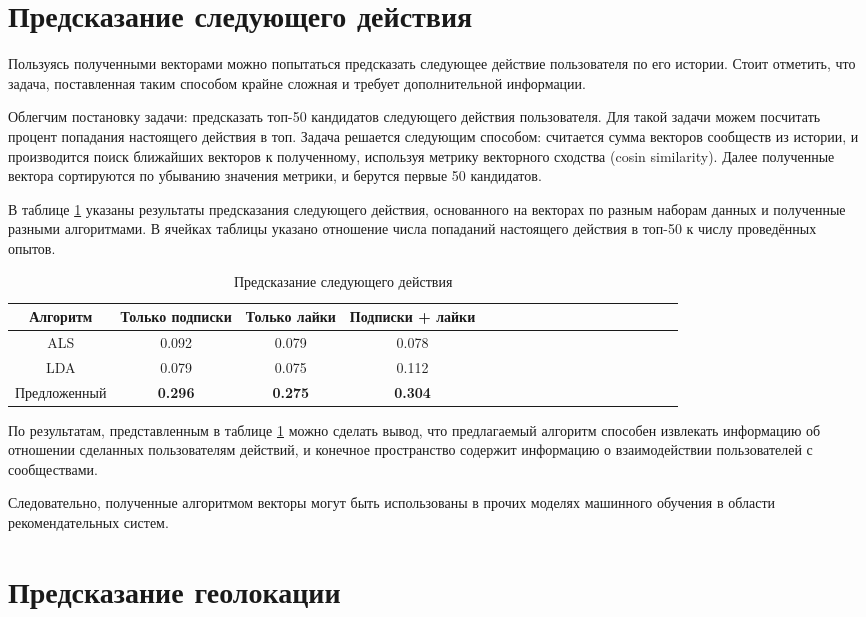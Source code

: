 \documentclass[times,specification,annotation]{itmo-student-thesis}
\begin{document}
\section{Предсказание следующего действия}\label{sec:next-action}
Пользуясь полученными векторами можно попытаться предсказать следующее действие пользователя по его истории. Стоит отметить, что задача, поставленная таким способом крайне сложная и требует дополнительной информации.

Облегчим постановку задачи: предсказать топ-50 кандидатов следующего действия пользователя. Для такой задачи можем посчитать процент попадания настоящего действия в топ. Задача решается следующим способом: считается сумма векторов сообществ из истории, и производится поиск ближайших векторов к полученному, используя метрику векторного сходства (cosin similarity). Далее полученные вектора сортируются по убыванию значения метрики, и берутся первые 50 кандидатов.

В таблице \ref {tab2-next-action} указаны результаты предсказания следующего действия, основанного на векторах по разным наборам данных и полученные разными алгоритмами. В ячейках таблицы указано отношение числа попаданий настоящего действия в топ-50 к числу проведённых опытов.  

\begin{table}[!h]
\caption{Предсказание следующего действия} \label{tab2-next-action}
\centering
\begin{tabular}{|*{18}{c|}}\hline
Алгоритм  & Только подписки  & Только лайки & Подписки + лайки \\\hline
ALS                        & 0.092 & 0.079  & 0.078 \\\hline
LDA                       & 0.079 & 0.075  & 0.112 \\\hline
Предложенный & \textbf{0.296} & \textbf{0.275} & \textbf{0.304} \\\hline
\end{tabular}
\end{table}

По результатам, представленным в таблице \ref{tab2-next-action} можно сделать вывод, что предлагаемый алгоритм способен извлекать информацию об отношении сделанных пользователям действий, и конечное пространство содержит информацию о взаимодействии пользователей с сообществами. 

Следовательно, полученные алгоритмом векторы могут быть использованы в прочих моделях машинного обучения в области рекомендательных систем.


\section{Предсказание геолокации} \label{sec:geo}
\end{document}
